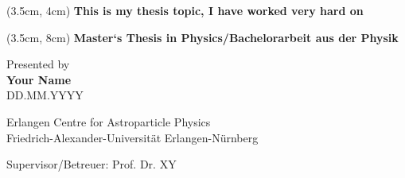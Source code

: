 
\begin{center}

    \vspace*{3cm}
 
    \begin{textblock*}{15 cm}(3.5cm, 4cm)
        \Large \bf{This is my thesis topic, I have worked very hard on}
    \end{textblock*}

    \begin{textblock*}{15 cm}(3.5cm, 8cm)
        \bf{Master‘s Thesis in Physics/Bachelorarbeit aus der Physik}
    \end{textblock*}

    \vspace{4cm}
    
    \vspace{1.2cm}
            Presented by\\
            {\bf Your Name} \\
            DD.MM.YYYY

    \vspace*{2.5 cm}
    Erlangen Centre for Astroparticle Physics\\
    Friedrich-Alexander-Universität Erlangen-Nürnberg
    \vspace*{1 cm}

    \vspace*{6 cm}
    Supervisor/Betreuer: Prof. Dr. XY
    \vspace*{1 cm}

\end{center}
